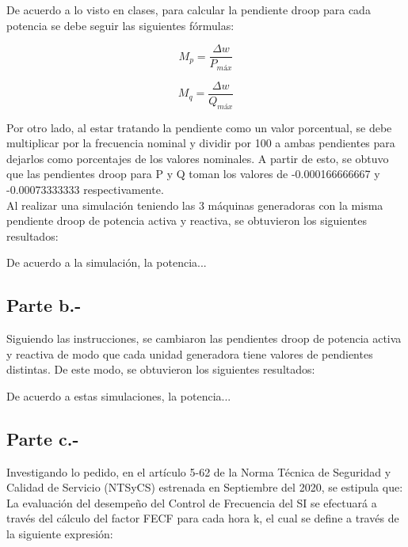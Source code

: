 De acuerdo a lo visto en clases, para calcular la pendiente droop para cada potencia se debe seguir las siguientes fórmulas:

\begin{equation}
    M_p = \frac{\Delta w}{P_{máx}}
\end{equation}

\begin{equation}
    M_q = \frac{\Delta w}{Q_{máx}}
\end{equation}

Por otro lado, al estar tratando la pendiente como un valor porcentual, se debe multiplicar por la frecuencia nominal y dividir por 100 a ambas pendientes para dejarlos como porcentajes de los valores nominales. A partir de esto, se obtuvo que las pendientes droop para P y Q toman los valores de -0.000166666667 y -0.00073333333 respectivamente.\\

Al realizar una simulación teniendo las 3 máquinas generadoras con la misma pendiente droop de potencia activa y reactiva, se obtuvieron los siguientes resultados:



De acuerdo a la simulación, la potencia...

\subsection{Parte b.-}

Siguiendo las instrucciones, se cambiaron las pendientes droop de potencia activa y reactiva de modo que cada unidad generadora tiene valores de pendientes distintas. De este modo, se obtuvieron los siguientes resultados:



De acuerdo a estas simulaciones, la potencia...

\subsection{Parte c.-}

Investigando lo pedido, en el artículo 5-62 de la Norma Técnica de Seguridad y Calidad de Servicio (NTSyCS) estrenada en Septiembre del 2020, se estipula que:\\

La evaluación del desempeño del Control de Frecuencia del SI se efectuará a través del cálculo del factor FECF para cada hora k, el cual se define a través de la siguiente expresión:

